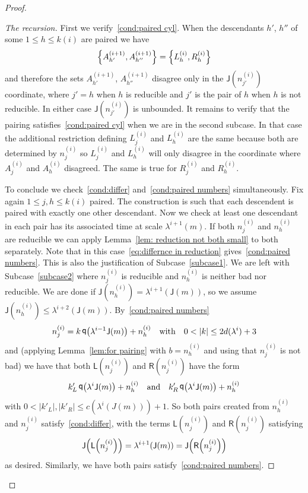 \documentclass[AHL,Unicode,longabstracts,published]{cedram}
\DeclareMathOperator{\q}{\mathsf{q}}
\newcommand{\lft}{\mathsf{L}}
\newcommand{\rht}{\mathsf{R}}
\newcommand{\scl}{\mathsf{J}}
\let\originalleft\left
\let\originalright\right
\renewcommand{\left}{\mathopen{}\mathclose\bgroup\originalleft}
\renewcommand{\right}{\aftergroup\egroup\originalright}
\begin{document}
\begin{proof}
\begin{proof}[{The recursion}]
First we verify~\eqref{cond:paired cyl}. When the descendants $h'$, $h''$ of some $1 \le h \le k(i)$ are paired we have
\[
\left\{ A^{(i+1)}_{h'}, A^{(i+1)}_{h''} \right\} = \left\{ L^{(i)}_h, R^{(i)}_h \right\}
\]
and therefore the sets $A^{(i+1)}_{h'}$, $A^{(i+1)}_{h''}$ disagree only in the $\scl(n^{(i)}_{j'})$ coordinate, where $j' = h$ when $h$ is reducible and $j'$ is the pair of $h$ when $h$ is not reducible. In either case $\scl(n^{(i)}_{j'})$ is unbounded. It remains to verify that the pairing satisfies~\eqref{cond:paired cyl} when we are in the second subcase. In that case the additional restriction defining $L^{(i)}_j$ and $L^{(i)}_h$ are the same because both are determined by $n^{(i)}_j$ so $L^{(i)}_j$ and $L^{(i)}_h$ will only disagree in the coordinate where $A^{(i)}_j$ and $A^{(i)}_h$ disagreed. The same is true for $R^{(i)}_j$ and $R^{(i)}_h$.


To conclude we check~\eqref{cond:differ} and~\eqref{cond:paired numbers} simultaneously. Fix again $1 \le j,h \le k(i)$ paired. The construction is such that each descendent is paired with exactly one other descendant. Now we check at least one descendant in each pair has its associated time at scale $\lambda^{i+1}(m)$. If both $n_j^{(i)}$ and $n_h^{(i)}$ are reducible we can apply Lemma~\ref{lem: reduction not both small} to both separately. Note that in this case~\eqref{eq:differnce in reduction} gives~\eqref{cond:paired numbers}. This is also the justification of Subcase~\eqref{subcase1}. We are left with Subcase~\eqref{subcase2} where $n_j^{(i)}$ is reducible and $n_h^{(i)}$ is neither bad nor reducible. We are done if $\scl(n_h^{(i)}) = \lambda^{i+1}(\scl(m))$, so we assume $\scl(n_h^{(i)}) \le \lambda^{i+2}(\scl(m))$. By~\eqref{cond:paired numbers}
\[
n_j^{(i)}=k \q\left(\lambda^{i-1}\scl(m)\right)+n_h^{(i)} \quad\text{with}\quad 0<|k|\leq 2d(\lambda^{i})+3
\]
and (applying Lemma~\ref{lem:for pairing} with $b = n^{(i)}_h$ and using that $n^{(i)}_j$ is not bad) we have that both $\lft(n_j^{(i)})$ and $\rht(n_j^{(i)})$ have the form
\[
k'_L \q\left(\lambda^i \scl(m)\right) + n_h^{(i)} \quad\text{and}\quad k'_R \q\left(\lambda^i \scl(m)\right) + n_h^{(i)}
\]
with $0<|k'_L|,|k'_R|\leq c(\lambda^i(J(m))) + 1$. So both pairs created from $n_h^{(i)}$ and $n_j^{(i)}$ satisfy~\eqref{cond:differ}, with the terms $\lft(n_j^{(i)})$ and $\rht(n_j^{(i)})$ satisfying
\[
\scl\left(\lft\left(n_j^{(i)}\right)\right) = \lambda^{i+1}\left(\scl(m)\right) = \scl\left(\rht\left(n_j^{(i)}\right)\right)
\]
as desired. Similarly, we have both pairs satisfy~\eqref{cond:paired numbers}.
\end{proof}
\let\qed\relax
\end{proof}
\end{document}
